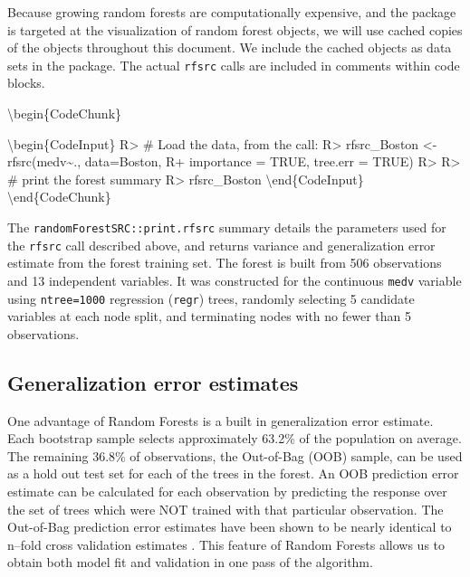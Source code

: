\documentclass[article]{jss}
\begin{document}
Because growing random forests are computationally expensive, and the
 package is targeted at the visualization of random
forest objects, we will use cached copies of the 
objects throughout this document. We include the cached objects as data
sets in the  package. The actual \texttt{rfsrc}
calls are included in comments within code blocks.

\textbackslash{}begin\{CodeChunk\}

\textbackslash{}begin\{CodeInput\} R\textgreater{} \# Load the data,
from the call: R\textgreater{} rfsrc\_Boston \textless{}-
rfsrc(medv\textasciitilde{}., data=Boston, R+ importance = TRUE,
tree.err = TRUE) R\textgreater{} R\textgreater{} \# print the forest
summary R\textgreater{} rfsrc\_Boston \textbackslash{}end\{CodeInput\}
\textbackslash{}end\{CodeChunk\}

The \texttt{randomForestSRC::print.rfsrc} summary details the parameters
used for the \texttt{rfsrc} call described above, and returns variance
and generalization error estimate from the forest training set. The
forest is built from 506 observations and 13 independent variables. It
was constructed for the continuous \texttt{medv} variable using
\texttt{ntree=1000} regression (\texttt{regr}) trees, randomly selecting
5 candidate variables at each node split, and terminating nodes with no
fewer than 5 observations.

\hypertarget{generalization-error-estimates}{%
\subsection{Generalization error
estimates}\label{generalization-error-estimates}}

One advantage of Random Forests is a built in generalization error
estimate. Each bootstrap sample selects approximately 63.2\% of the
population on average. The remaining 36.8\% of observations, the
Out-of-Bag (OOB) \citep{BreimanOOB:1996e} sample, can be used as a hold
out test set for each of the trees in the forest. An OOB prediction
error estimate can be calculated for each observation by predicting the
response over the set of trees which were NOT trained with that
particular observation. The Out-of-Bag prediction error estimates have
been shown to be nearly identical to n--fold cross validation estimates
\citep{StatisticalLearning:2009}. This feature of Random Forests allows
us to obtain both model fit and validation in one pass of the algorithm.
\end{document}
